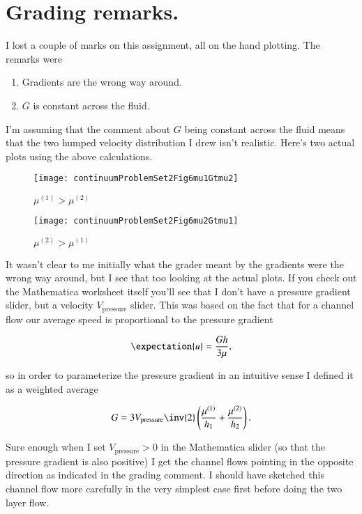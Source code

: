 \section{Grading remarks.}

I lost a couple of marks on this assignment, all on the hand plotting.  The remarks were

\begin{enumerate}
\item Gradients are the wrong way around.
\item $G$ is constant across the fluid.
\end{enumerate}

I'm assuming that the comment about $G$ being constant across the fluid means that the two humped velocity distribution I drew isn't realistic.  Here's two actual plots using the above calculations.

\begin{figure}[htp]
   \centering
   \texttt{[image: continuumProblemSet2Fig6mu1Gtmu2]}
   \caption{$\mu^{(1)} > \mu^{(2)}$}\label{fig:continuumProblemSet2:continuumProblemSet2Fig6mu1Gtmu2}
\end{figure}

\begin{figure}[htp]
   \centering
   \texttt{[image: continuumProblemSet2Fig6mu2Gtmu1]}
   \caption{$\mu^{(2)} > \mu^{(1)}$}\label{fig:continuumProblemSet2:continuumProblemSet2Fig6mu2Gtmu1}
\end{figure}

It wasn't clear to me initially what the grader meant by the gradients were the wrong way around, but I see that too looking at the actual plots.  If you check out the Mathematica worksheet itself you'll see that I don't have a pressure gradient slider, but a velocity $V_{\text{pressure}}$ slider.  This was based on the fact that for a channel flow our average speed is proportional to the pressure gradient

\begin{equation}\label{eqn:continuumProblemSet2:940}
\expectation{u} = \frac{G h}{3 \mu},
\end{equation}

so in order to parameterize the pressure gradient in an intuitive sense I defined it as a weighted average

\begin{equation}\label{eqn:continuumProblemSet2:960}
G = 3 V_{\text{pressure}} \inv{2} \left( \frac{\mu^{(1)}}{h_1} + \frac{\mu^{(2)}}{h_2}\right).
\end{equation}

Sure enough when I set $V_{\text{pressure}} > 0$ in the Mathematica slider (so that the pressure gradient is also positive) I get the channel flows pointing in the opposite direction as indicated in the grading comment.  I should have sketched this channel flow more carefully in the very simplest case first before doing the two layer flow.

\EndNoBibArticle
